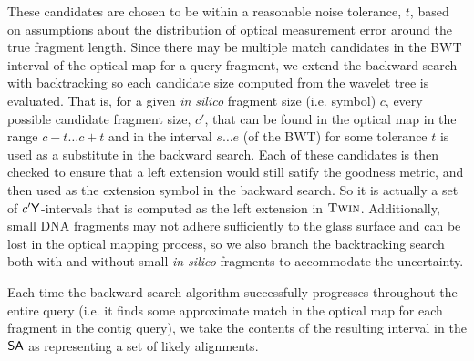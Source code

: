 These candidates are chosen to be within a reasonable noise tolerance, $t$, based on assumptions about the distribution of optical measurement error around the true fragment length.
Since there may be multiple match candidates in the BWT interval of the optical map for a query fragment, we extend the backward search with backtracking so each candidate size computed from the wavelet tree is evaluated.  That is, for a given \emph{in silico} fragment size (i.e. symbol) $c$, every possible candidate fragment size, $c'$, that can be found in the optical map in the range $c - t \ldots c + t$ and in the interval $s \ldots e$ (of the BWT) for some tolerance $t$ is used as a substitute in the backward search. Each of these candidates is then checked to ensure that a left extension would still satify the goodness metric, and then used as the extension symbol in the backward search.  So it is actually a set of $c'\mathsf{Y}$-intervals that is computed as the left extension in $\mbox{\rm \textsc{Twin}}$.  Additionally, small DNA fragments may not adhere sufficiently to the glass surface and can be lost in the optical mapping process, so we also branch the backtracking search both with and without small \emph{in silico} fragments to accommodate the uncertainty.

Each time the backward search algorithm successfully progresses throughout the entire query (i.e. it finds some approximate match in the optical map for each fragment in the contig query), we take the contents of the resulting interval in the $\mbox{\rm {\sf SA}}$ as representing a set of likely alignments.










